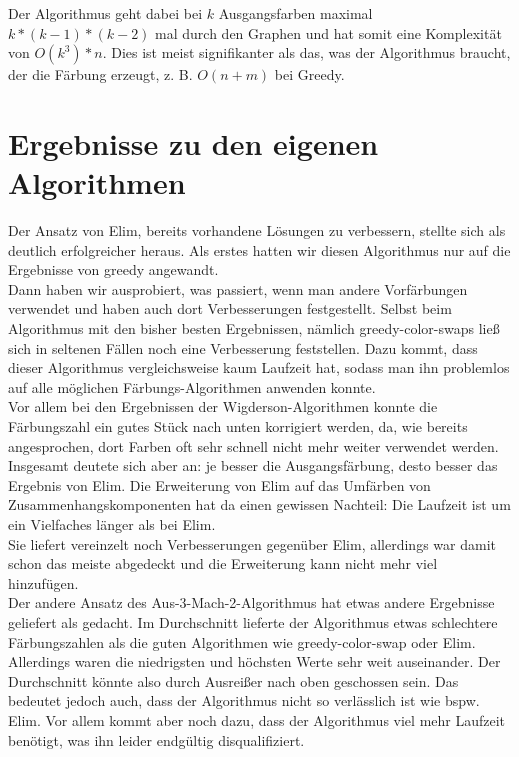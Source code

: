 \documentclass[11pt]{article}
\begin{document}
Der Algorithmus geht dabei bei $k$ Ausgangsfarben maximal $k*(k-1)*(k-2)$ mal durch den Graphen und hat somit eine Komplexität von $O(k^3)*n$.
Dies ist meist signifikanter als das, was der Algorithmus braucht, der die Färbung erzeugt, z. B. $O(n+m)$ bei Greedy. \\

\section{Ergebnisse zu den eigenen Algorithmen} %

Der Ansatz von Elim, bereits vorhandene Lösungen zu verbessern, stellte sich als deutlich erfolgreicher heraus. Als erstes hatten wir diesen Algorithmus nur auf die Ergebnisse von greedy angewandt. \\
Dann haben wir ausprobiert, was passiert, wenn man andere Vorfärbungen verwendet und haben auch dort Verbesserungen festgestellt. Selbst beim Algorithmus mit den bisher besten Ergebnissen, nämlich greedy-color-swaps
ließ sich in seltenen Fällen noch eine Verbesserung feststellen. Dazu kommt, dass dieser Algorithmus vergleichsweise kaum Laufzeit hat, sodass man ihn problemlos auf alle möglichen Färbungs-Algorithmen anwenden konnte. \\
Vor allem bei den Ergebnissen der Wigderson-Algorithmen konnte die Färbungszahl ein gutes Stück nach unten korrigiert werden, da, wie bereits angesprochen, dort Farben oft sehr schnell nicht mehr weiter verwendet werden. \\
Insgesamt deutete sich aber an: je besser die Ausgangsfärbung, desto besser das Ergebnis von Elim.  
Die Erweiterung von Elim auf das Umfärben von Zusammenhangskomponenten hat da einen gewissen Nachteil: Die Laufzeit ist um ein Vielfaches länger als bei Elim. \\ %
Sie liefert vereinzelt noch Verbesserungen gegenüber Elim, allerdings war damit schon das meiste abgedeckt und die Erweiterung kann nicht mehr viel hinzufügen. \\
Der andere Ansatz des Aus-3-Mach-2-Algorithmus hat etwas andere Ergebnisse geliefert als gedacht. Im Durchschnitt lieferte der Algorithmus etwas schlechtere Färbungszahlen als die guten Algorithmen wie greedy-color-swap oder Elim.
Allerdings waren die niedrigsten und höchsten Werte sehr weit auseinander. Der Durchschnitt könnte also durch Ausreißer nach oben geschossen sein. 
Das bedeutet jedoch auch, dass der Algorithmus nicht so verlässlich ist wie bspw. Elim. Vor allem kommt aber noch dazu, dass der Algorithmus viel mehr Laufzeit benötigt, was ihn leider endgültig disqualifiziert. \\
\end{document}
